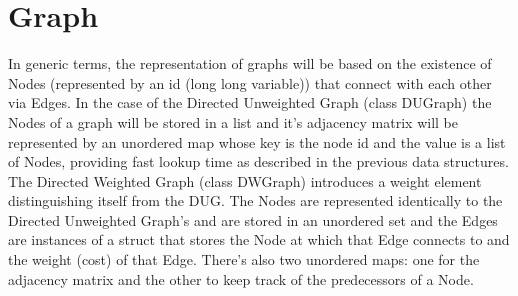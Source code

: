 \section{Graph}
In generic terms, the representation of graphs will be based on the existence of Nodes (represented by an id (long long variable)) that connect with each other via Edges.
In the case of the Directed Unweighted Graph (class DUGraph) the Nodes of a graph will be stored in a list and it's adjacency matrix will be represented by an unordered map whose key is the node id and the value is a list of Nodes, providing fast lookup time as described in the previous data structures.
The Directed Weighted Graph (class DWGraph) introduces a weight element distinguishing itself from the DUG. The Nodes are represented identically to the Directed Unweighted Graph's and are stored in an unordered set and the Edges are instances of a struct that stores the Node at which that Edge connects to and the weight (cost) of that Edge. There's also two unordered maps: one for the adjacency matrix and the other to keep track of the predecessors of a Node.
